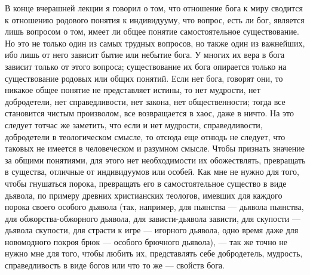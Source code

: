 \documentclass[12pt]{article}
\begin{document}
В конце вчерашней лекции я говорил о том, что отношение бога к миру сводится к отношению родового понятия к индивидууму, что вопрос, есть ли бог, является лишь вопросом о том, имеет ли общее понятие самостоятельное существование. Но это не только один из самых трудных вопросов, но также один из важнейших, ибо лишь от него зависит бытие или небытие бога. У многих их вера в бога зависит только от этого вопроса; существование их бога опирается только на существование родовых или общих понятий. Если нет бога, говорят они, то никакое общее понятие не представляет истины, то нет мудрости, нет добродетели, нет справедливости, нет закона, нет общественности; тогда все становится чистым произволом, все возвращается в хаос, даже в ничто. На это следует тотчас же заметить, что если и нет мудрости, справедливости, добродетели в теологическом смысле, то отсюда еще отнюдь не следует, что таковых не имеется в человеческом и разумном смысле. Чтобы признать значение за общими понятиями, для этого нет необходимости их обожествлять, превращать в существа, отличные от индивидуумов или особей. Как мне не нужно для того, чтобы гнушаться порока, превращать его в самостоятельное существо в виде дьявола, по примеру древних христианских теологов, имевших для каждого порока своего особого дьявола (так, например, для пьянства --- дьявола пьянства, для обжорства-обжорного дьявола, для зависти-дьявола зависти, для скупости --- дьявола скупости, для страсти к игре --- игорного дьявола, одно время даже для новомодного покроя брюк --- особого брючного дьявола), --- так же точно не нужно мне для того, чтобы любить их, представлять себе добродетель, мудрость, справедливость в виде богов или что то же --- свойств бога. 
\end{document}
